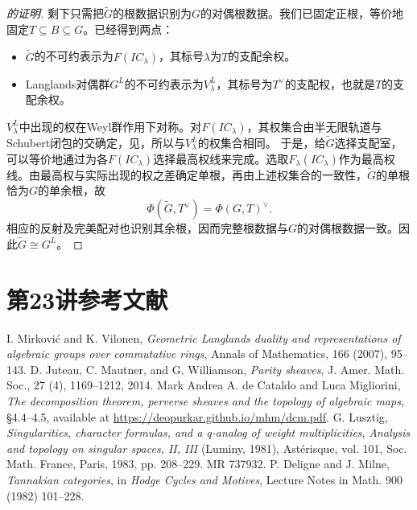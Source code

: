 \begin{proof}[的证明]
剩下只需把$\widetilde G$的根数据识别为$G$的对偶根数据。我们已固定正根，等价地固定$T\subseteq B\subseteq G$。已经得到两点：
\begin{itemize}
\item $\widetilde G$的不可约表示为$F(IC_\lambda)$，其标号$\lambda$为$T$的支配余权。
\item Langlands对偶群$G^L$的不可约表示为$V^L_\lambda$，其标号为$T^\vee$的支配权，也就是$T$的支配余权。
\end{itemize}
$V^L_\lambda$中出现的权在Weyl群作用下对称。对$F(IC_\lambda)$，其权集合由半无限轨道与Schubert闭包的交确定，见，所以与$V^L_\lambda$的权集合相同。
于是，给$\widetilde G$选择支配室，可以等价地通过为各$F(IC_\lambda)$选择最高权线来完成。选取$F_\lambda(IC_\lambda)$作为最高权线。由最高权与实际出现的权之差确定单根，再由上述权集合的一致性，$\widetilde G$的单根恰为$G$的单余根，故
\[\Phi(\widetilde G,T^\vee)=\Phi(G,T)^\vee.\]
相应的反射及完美配对也识别其余根，因而完整根数据与$G$的对偶根数据一致。因此$\widetilde G\cong G^L$。
\end{proof}
\section{第23讲参考文献}\label{L23S4}
\begin{references}
 I. Mirkovi\'c and K. Vilonen, \textit{Geometric Langlands duality and representations of algebraic groups over commutative rings}, Annals of Mathematics, 166 (2007), 95--143.
 D. Juteau, C. Mautner, and G. Williamson, \textit{Parity sheaves}, J. Amer. Math. Soc., 27 (4), 1169--1212, 2014.
 Mark Andrea A. de Cataldo and Luca Migliorini, \textit{The decomposition theorem, perverse sheaves and the topology of algebraic maps}, \S4.4--4.5, available at \url{https://deopurkar.github.io/mhm/dcm.pdf}.
 G. Lusztig, \textit{Singularities, character formulas, and a q-analog of weight multiplicities}, \textit{Analysis and topology on singular spaces, II, III} (Luminy, 1981), Ast\'erisque, vol. 101, Soc. Math. France, Paris, 1983, pp. 208--229. MR 737932.
 P. Deligne and J. Milne, \textit{Tannakian categories}, in \textit{Hodge Cycles and Motives}, Lecture Notes in Math. 900 (1982) 101--228.
\end{references}
